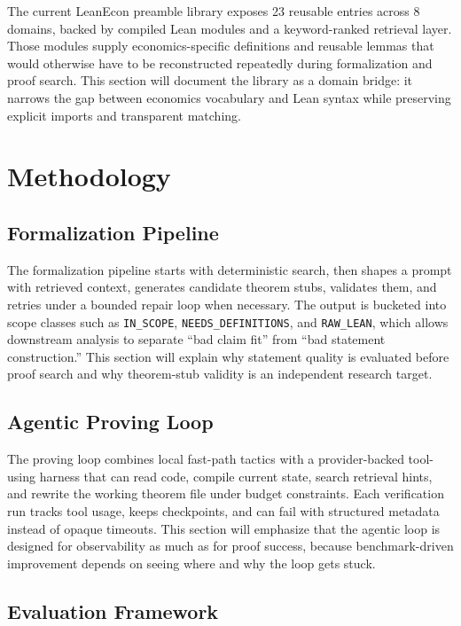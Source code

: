 \documentclass[11pt,letterpaper]{article}
\begin{document}
The current LeanEcon preamble library exposes 23 reusable entries across 8 domains, backed by compiled Lean modules and a keyword-ranked retrieval layer. Those modules supply economics-specific definitions and reusable lemmas that would otherwise have to be reconstructed repeatedly during formalization and proof search. This section will document the library as a domain bridge: it narrows the gap between economics vocabulary and Lean syntax while preserving explicit imports and transparent matching.

\section{Methodology}

\subsection{Formalization Pipeline}

The formalization pipeline starts with deterministic search, then shapes a prompt with retrieved context, generates candidate theorem stubs, validates them, and retries under a bounded repair loop when necessary. The output is bucketed into scope classes such as \texttt{IN\_SCOPE}, \texttt{NEEDS\_DEFINITIONS}, and \texttt{RAW\_LEAN}, which allows downstream analysis to separate ``bad claim fit'' from ``bad statement construction.'' This section will explain why statement quality is evaluated before proof search and why theorem-stub validity is an independent research target.

\subsection{Agentic Proving Loop}

The proving loop combines local fast-path tactics with a provider-backed tool-using harness that can read code, compile current state, search retrieval hints, and rewrite the working theorem file under budget constraints. Each verification run tracks tool usage, keeps checkpoints, and can fail with structured metadata instead of opaque timeouts. This section will emphasize that the agentic loop is designed for observability as much as for proof success, because benchmark-driven improvement depends on seeing where and why the loop gets stuck.

\subsection{Evaluation Framework}
\end{document}

